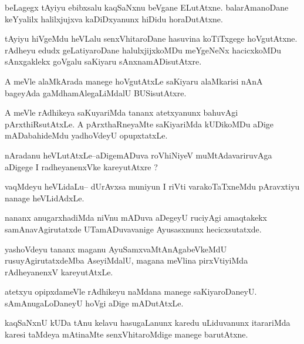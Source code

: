\documentclass{article}
\begin{document}
\begin{mn}%
beLagegx tAyiyu ebibxsalu kaqSaNxnu beVgane ELutAtxne. balarAmanoDane keYyalilx 
halilxjujxva kaDiDxyanunx hiDidu horaDutAtxne.
\end{mn}

\begin{mn}%
tAyiyu hiVgeMdu heVLalu senxVhitaroDane hasuvina koTiTxgege hoVgutAtxne. rAdheyu edudx 
geLatiyaroDane halulxjijxkoMDu meYgeNeNx hacicxkoMDu sAnxgaklekx goVgalu saKiyaru 
sAnxnamADisutAtxre.
\end{mn}

\begin{mn}%
A meVle alaMkArada manege hoVgutAtxLe saKiyaru alaMkarisi nAnA bageyAda 
gaMdhamAlegaLiMdalU BUSisutAtxre.
\end{mn}

\begin{mn}%
A meVle rAdhikeya saKuyariMda tananx atetxyanunx bahuvAgi pArxthiRsutAtxLe. A 
pArxthaRneyaMte saKiyariMda kUDikoMDu aDige mADabahideMdu yadhoVdeyU opupxtatxLe.
\end{mn}

\begin{mn}%
nAradanu heVLutAtxLe--aDigemADuva roVhiNiyeV muMtAdavariruvAga aDigege I radheyanenxVke 
kareyutAtxre ?
\end{mn}

\begin{mn}%
vaqMdeyu heVLidaLu-- dUrAvxsa muniyun I riVti varakoTaTxneMdu pAravxtiyu nanage heVLidAdxLe.
\end{mn}

\begin{mn}%
nananx anugarxhadiMda niVnu mADuva aDegeyU ruciyAgi amaqtakekx samAnavAgirutatxde 
UTamADuvavanige Ayusasxnunx hecicxsutatxde.
\end{mn}

\begin{mn}%
yashoVdeyu tananx maganu AyuSamxvaMtAnAgabeVkeMdU rusuyAgirutatxdeMba AseyiMdalU, magana 
meVlina pirxVtiyiMda rAdheyanenxV kareyutAtxLe.
\end{mn}

\begin{mn}%
atetxyu opipxdameVle rAdhikeyu naMdana manege saKiyaroDaneyU. sAmAnugaLoDaneyU hoVgi aDige 
mADutAtxLe.
\end{mn}

\begin{mn}%
kaqSaNxnU kUDa tAnu kelavu hasugaLanunx karedu uLiduvanunx itarariMda karesi taMdeya 
mAtinaMte senxVhitaroMdige manege barutAtxne.
\end{mn}
\end{document}
